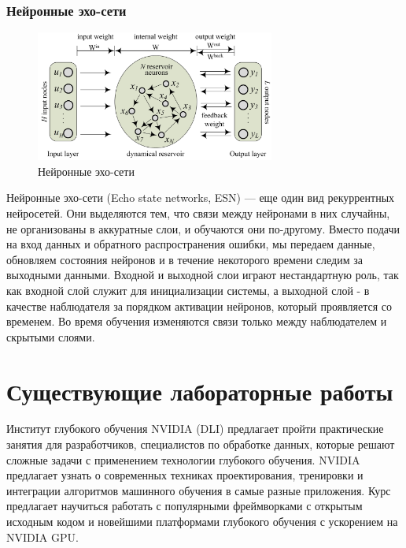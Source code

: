 \subsubsection{Нейронные эхо-сети}
\begin{figure}[htbp]
	\centering
			\caption{Нейронные эхо-сети}
	\includegraphics[width=0.7\textwidth]{fig/ESN.png}
\end{figure}
Нейронные эхо-сети (Echo state networks, ESN) — еще один вид рекуррентных нейросетей. Они выделяются тем, что связи между нейронами в них случайны, не организованы в аккуратные слои, и обучаются они по-другому. Вместо подачи на вход данных и обратного распространения ошибки, мы передаем данные, обновляем состояния нейронов и в течение некоторого времени следим за выходными данными. Входной и выходной слои играют нестандартную роль, так как входной слой служит для инициализации системы, а выходной слой - в качестве наблюдателя за порядком активации нейронов, который проявляется со временем. Во время обучения изменяются связи только между наблюдателем и скрытыми слоями.







\section{Существующие лабораторные работы}

Институт глубокого обучения NVIDIA (DLI) предлагает пройти практические занятия для разработчиков, специалистов по обработке данных, которые решают сложные задачи с применением технологии глубокого обучения. NVIDIA предлагает узнать о современных техниках проектирования, тренировки и интеграции алгоритмов машинного обучения в самые разные приложения. Курс предлагает научиться работать с популярными фреймворками с открытым исходным кодом и новейшими платформами глубокого обучения с ускорением на NVIDIA GPU.

